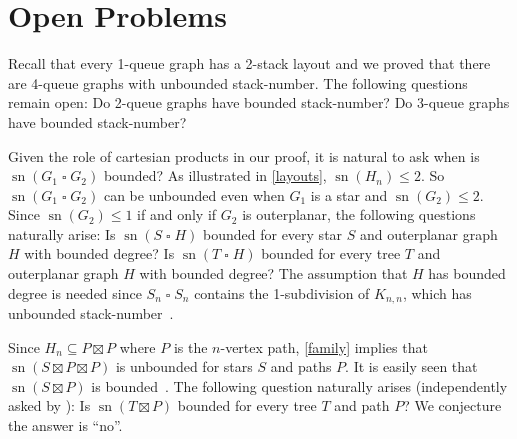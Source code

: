 \documentclass[kpfonts]{patmorin}
\DeclareMathOperator{\sn}{sn}
\renewcommand{\leq}{\leqslant}
\newcommand{\CartProd}{\mathbin{\square}}
\begin{document}
\section{Open Problems}

Recall that every 1-queue graph has a 2-stack layout \citep{HLR92} and we proved that there are 4-queue graphs with unbounded stack-number. The following questions remain open: Do 2-queue graphs have bounded stack-number? Do 3-queue graphs have bounded stack-number? 

Given the role of cartesian products in our proof, it is natural to ask when is $\sn(G_1\CartProd G_2)$ bounded? As illustrated in \cref{layouts}, $\sn(H_n) \leq 2$. So $\sn(G_1\CartProd G_2)$ can be unbounded even when $G_1$ is a star and $\sn(G_2)\leq 2$. Since $\sn(G_2)\leq 1$ if and only if $G_2$ is outerplanar, the following questions naturally arise: Is $\sn(S \CartProd H)$ bounded for every star $S$ and outerplanar graph $H$ with bounded degree? Is $\sn(T \CartProd H)$ bounded for every tree $T$ and outerplanar graph $H$ with bounded degree? The assumption that $H$ has bounded degree is needed since $S_n \CartProd S_n$ contains the 1-subdivision of $K_{n,n}$, which has unbounded stack-number~\citep{Blankenship-PhD03}.

Since $H_n\subseteq P \boxtimes P$ where $P$ is the $n$-vertex path, \cref{family} implies that $\sn(S\boxtimes P\boxtimes P)$ is unbounded for stars $S$ and paths $P$. It is easily seen that $\sn(S\boxtimes P)$ is bounded~\citep{Pupyrev20}. The following question naturally arises (independently asked by \citet{Pupyrev20}):
Is $\sn(T \boxtimes P)$ bounded for every tree $T$ and path $P$? We conjecture the answer is ``no''.

\let\oldthebibliography=\thebibliography
\let\endoldthebibliography=\endthebibliography
\renewenvironment{thebibliography}[1]{%
\begin{oldthebibliography}{#1}%
\setlength{\parskip}{-0.1ex}%
\setlength{\itemsep}{-0.1ex}%
}{\end{oldthebibliography}}

%




\end{document}
